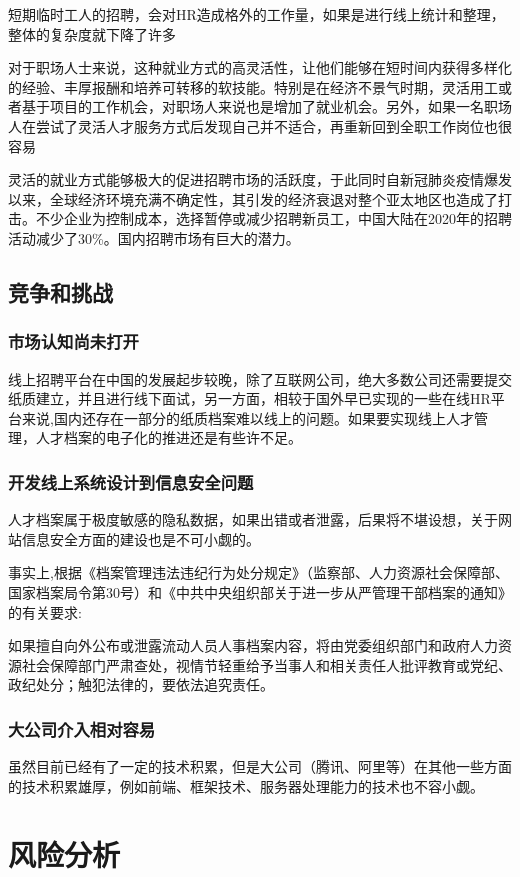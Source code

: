 \documentclass[a4,UTF8]{ctexart}
\begin{document}
短期临时工人的招聘，会对HR造成格外的工作量，如果是进行线上统计和整理，整体的复杂度就下降了许多

对于职场人士来说，这种就业方式的高灵活性，让他们能够在短时间内获得多样化的经验、丰厚报酬和培养可转移的软技能。特别是在经济不景气时期，灵活用工或者基于项目的工作机会，对职场人来说也是增加了就业机会。另外，如果一名职场人在尝试了灵活人才服务方式后发现自己并不适合，再重新回到全职工作岗位也很容易


	灵活的就业方式能够极大的促进招聘市场的活跃度，于此同时自新冠肺炎疫情爆发以来，全球经济环境充满不确定性，其引发的经济衰退对整个亚太地区也造成了打击。不少企业为控制成本，选择暂停或减少招聘新员工，中国大陆在2020年的招聘活动减少了30\%。国内招聘市场有巨大的潜力。
\subsection{竞争和挑战}
\subsubsection{市场认知尚未打开}
线上招聘平台在中国的发展起步较晚，除了互联网公司，绝大多数公司还需要提交纸质建立，并且进行线下面试，另一方面，相较于国外早已实现的一些在线HR平台来说,国内还存在一部分的纸质档案难以线上的问题。如果要实现线上人才管理，人才档案的电子化的推进还是有些许不足。
\subsubsection{开发线上系统设计到信息安全问题}
人才档案属于极度敏感的隐私数据，如果出错或者泄露，后果将不堪设想，关于网站信息安全方面的建设也是不可小觑的。

事实上,根据《档案管理违法违纪行为处分规定》（监察部、人力资源社会保障部、国家档案局令第30号）和《中共中央组织部关于进一步从严管理干部档案的通知》的有关要求:

如果擅自向外公布或泄露流动人员人事档案内容，将由党委组织部门和政府人力资源社会保障部门严肃查处，视情节轻重给予当事人和相关责任人批评教育或党纪、政纪处分；触犯法律的，要依法追究责任。
\subsubsection{大公司介入相对容易}
虽然目前已经有了一定的技术积累，但是大公司（腾讯、阿里等）在其他一些方面的技术积累雄厚，例如前端、框架技术、服务器处理能力的技术也不容小觑。
\section{风险分析}
\end{document}
